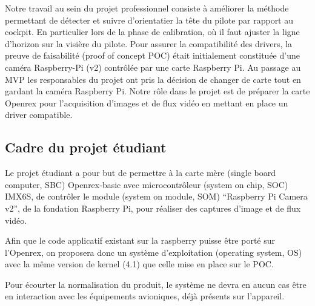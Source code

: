 Notre travail au sein du projet professionnel consiste à améliorer la méthode permettant de détecter et suivre
d’orientatier la tête du pilote par rapport au cockpit. En particulier lors de la phase de
calibration, où il faut ajuster la ligne d’horizon sur la visière du pilote. Pour assurer la
compatibilité des drivers, la preuve de faisabilité (proof of concept POC) était initialement
constituée d’une caméra Raspberry-Pi (v2) contrôlée par une carte Raspberry Pi. Au passage au MVP
les responsables du projet ont pris la décision de changer de carte tout en gardant la caméra
Raspberry Pi. Notre rôle dans le projet est de préparer la carte Openrex pour l’acquisition d’images
et de flux vidéo en mettant en place un driver compatible. 


\subsection{Cadre du projet étudiant}

Le projet étudiant a pour but de permettre à la carte mère (single board computer, SBC) Openrex-basic
avec microcontrôleur (system on chip, SOC) IMX6S, de contrôler le module (system on module, SOM)
“Raspberry Pi Camera v2”, de la fondation Raspberry Pi, pour réaliser des captures d’image et de flux
vidéo. \medskip

Afin que le code applicatif existant sur la raspberry puisse être porté sur l’Openrex, on proposera
donc un système d’exploitation (operating system, OS) avec la même version de kernel (4.1) que celle
mise en place sur le POC.\medskip

Pour écourter la normalisation du produit, le système ne devra en aucun cas être en interaction avec
les équipements avioniques, déjà présents sur l’appareil.
